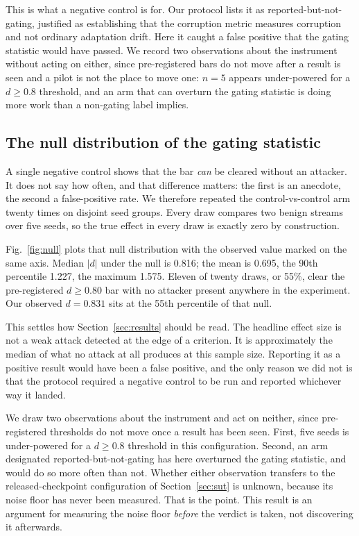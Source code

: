 \documentclass[journal]{IEEEtran}
\begin{document}
This is what a negative control is for. Our protocol lists it as
reported-but-not-gating, justified as establishing that the corruption metric
measures corruption and not ordinary adaptation drift. Here it caught a false
positive that the gating statistic would have passed. We record two observations
about the instrument without acting on either, since pre-registered bars do not
move after a result is seen and a pilot is not the place to move one: $n=5$
appears under-powered for a $d \geq 0.8$ threshold, and an arm that can overturn
the gating statistic is doing more work than a non-gating label implies.

\subsection{The null distribution of the gating statistic}
\label{sec:null}

A single negative control shows that the bar \emph{can} be cleared without an
attacker. It does not say how often, and that difference matters: the first is an
anecdote, the second a false-positive rate. We therefore repeated the
control-vs-control arm twenty times on disjoint seed groups. Every draw compares
two benign streams over five seeds, so the true effect in every draw is exactly
zero by construction.



Fig.~\ref{fig:null} plots that null distribution with the observed value marked
on the same axis. Median $|d|$ under the null is 0.816; the mean is
0.695, the 90th percentile 1.227, the maximum 1.575. Eleven of twenty
draws, or 55\%, clear the pre-registered $d \geq 0.80$ bar with no attacker
present anywhere in the experiment. Our observed $d = 0.831$ sits at the
55th percentile of that null.

This settles how Section~\ref{sec:results} should be read. The headline effect
size is not a weak attack detected at the edge of a criterion. It is
approximately the median of what no attack at all produces at this sample size.
Reporting it as a positive result would have been a false positive, and the only
reason we did not is that the protocol required a negative control to be run and
reported whichever way it landed.

We draw two observations about the instrument and act on neither, since
pre-registered thresholds do not move once a result has been seen. First, five
seeds is under-powered for a $d \geq 0.8$ threshold in this configuration.
Second, an arm designated reported-but-not-gating has here overturned the gating
statistic, and would do so more often than not. Whether either observation
transfers to the released-checkpoint configuration of Section~\ref{sec:sut} is
unknown, because its noise floor has never
been measured. That is the point. This result is an argument for measuring the
noise floor \emph{before} the verdict is taken, not discovering it afterwards.
\end{document}
